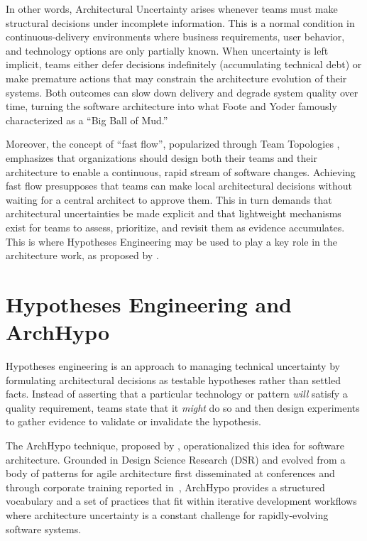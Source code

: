 In other words, Architectural Uncertainty arises whenever teams must make structural decisions under
incomplete information. This is a normal condition in continuous-delivery environments
where business requirements, user behavior, and technology options are only partially
known. When uncertainty is left implicit, teams either defer decisions indefinitely
(accumulating technical debt) or make premature actions that may constrain the
architecture evolution of their systems. Both outcomes can slow down delivery and degrade system
quality over time, turning the software architecture into what Foote and Yoder \citeyearpar{footeYoder1999} famously characterized as a ``Big Ball of Mud.''

Moreover, the concept of ``fast flow'', popularized through Team Topologies \citep{skelton2019}, emphasizes that organizations should design both their
teams and their architecture to enable a continuous, rapid stream of software changes.
Achieving fast flow presupposes that teams can make local architectural decisions
without waiting for a central architect to approve them. This in turn demands that architectural
uncertainties be made explicit and that lightweight mechanisms exist for teams to assess, prioritize, and revisit them as evidence accumulates. 
This is where Hypotheses Engineering may be used to play a key role in the architecture work, as proposed by \citet{silva2024tse}.

\section{Hypotheses Engineering and ArchHypo}
\label{sec:archhypo}

Hypotheses engineering is an approach to managing technical uncertainty by formulating
architectural decisions as testable hypotheses rather than settled facts. Instead of
asserting that a particular technology or pattern \emph{will} satisfy a quality
requirement, teams state that it \emph{might} do so and then design experiments to
gather evidence to validate or invalidate the hypothesis.

The ArchHypo technique, proposed by \citet{silva2024tse}, operationalized this idea for
software architecture. Grounded in Design Science Research (DSR)
and evolved from a body of patterns for agile architecture first disseminated at
conferences and through corporate training reported in~\citep{silva2024ieeesw}, ArchHypo provides
a structured vocabulary and a set of practices that fit within iterative development
workflows where architecture uncertainty is a constant challenge for rapidly-evolving software systems.

